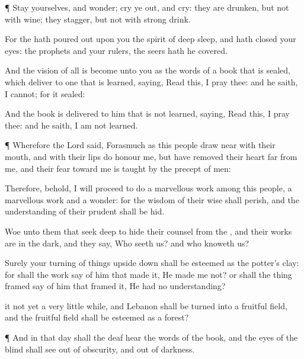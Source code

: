 {\par }{\PP {}¶
Stay yourselves, and
wonder; cry ye
out, and
cry: they are
drunken, but not with
wine; they
stagger, but not with strong
drink.

For the
{} hath poured
out upon you the
spirit of deep
sleep, and hath
closed your
eyes: the
prophets and your
rulers, the
seers hath he
covered.

And the
vision of all is become unto you as the
words of a
book that is
sealed, which
{}
deliver to one that is
learned,
saying,
Read this, I pray thee: and he
saith, I
cannot; for it
{}
sealed:

And the
book is
delivered to him that is not
learned,
saying,
Read this, I pray thee: and he
saith, I am not
learned.


\par }{\PP {}¶ Wherefore the
Lord
said,
Forasmuch as this
people draw
near
{} with their
mouth, and with their
lips do
honour me, but have
removed their
heart
far from me, and their
fear toward me is
taught by the
precept of
men:

Therefore, behold, I will
proceed to do a marvellous
work among this
people,
{} a marvellous
work and a
wonder: for the
wisdom of their
wise
{} shall
perish, and the
understanding of their
prudent
{} shall be
hid.

Woe unto them that seek
deep to
hide their
counsel from the
{}, and their
works are in the
dark, and they
say, Who
seeth us? and who
knoweth us?

Surely your turning of things upside
down shall be
esteemed as the
potter’s
clay: for shall the
work
say of him that
made it, He
made me not? or shall the thing
framed
say of him that
framed it, He had no
understanding?


\par }{\PP {} it not yet a
very little
while, and
Lebanon shall be
turned into a fruitful
field, and the fruitful
field shall be
esteemed as a
forest?


\par }{\PP {}¶ And in that
day shall the
deaf
hear the
words of the
book, and the
eyes of the
blind shall
see out of
obscurity, and out of
darkness.

}
